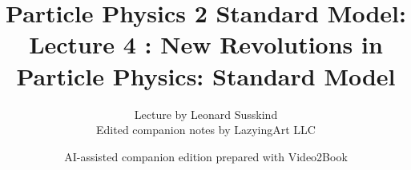 \documentclass[11pt,oneside]{book}
\begin{document}
\frontmatter
\title{Particle Physics 2 Standard Model: Lecture 4 : New Revolutions in Particle Physics: Standard Model}
\author{Lecture by Leonard Susskind\\Edited companion notes by LazyingArt LLC}
\date{AI-assisted companion edition prepared with Video2Book}
\maketitle
\clearpage
\mainmatter

\end{document}
